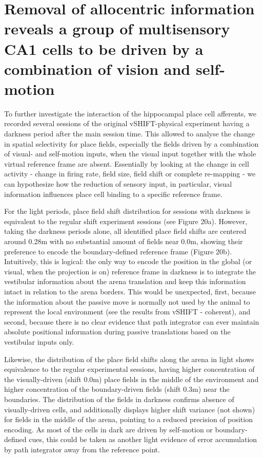 \section[Multisensory cells driven by a combination of vision and self-motion]{Removal of allocentric information reveals a group of multisensory CA1 cells to be driven by a combination of vision and self-motion%
              }
\label{sec:multisensory_integration}

To further investigate the interaction of the hippocampal place cell afferents, we recorded several sessions of the original vSHIFT-physical experiment having a darkness period after the main session time. This allowed to analyse the change in spatial selectivity for place fields, especially the fields driven by a combination of visual- and self-motion inputs, when the visual input together with the whole virtual reference frame are absent. Essentially by looking at the change in cell activity - change in firing rate, field size, field shift or complete re-mapping - we can hypothesize how the reduction of sensory input, in particular, visual information influences place cell binding to a specific reference frame.

For the light periods, place field shift distribution for sessions with darkness is equivalent to the regular shift experiment sessions (see Figure 20a). However, taking the darkness periods alone, all identified place field shifts are centered around 0.28m with no substantial amount of fields near 0.0m, showing their preference to encode the boundary-defined reference frame (Figure 20b). Intuitively, this is logical: the only way to encode the position in the global (or visual, when the projection is on) reference frame in darkness is to integrate the vestibular information about the arena translation and keep this information intact in relation to the arena borders. This would be unexpected, first, because the information about the passive move is normally not used by the animal to represent the local environment (see the results from vSHIFT - coherent), and second, because there is no clear evidence that path integrator can ever maintain absolute positional information during passive translations based on the vestibular inputs only.

Likewise, the distribution of the place field shifts along the arena in light shows equivalence to the regular experimental sessions, having higher concentration of the visually-driven (shift 0.0m) place fields in the middle of the environment and higher concentration of the boundary-driven fields (shift 0.3m) near the boundaries. The distribution of the fields in darkness confirms absence of visually-driven cells, and additionally displays higher shift variance (not shown) for fields in the middle of the arena, pointing to a reduced precision of position encoding. As most of the cells in dark are driven by self-motion or boundary-defined cues, this could be taken as another light evidence of error accumulation by path integrator away from the reference point.

